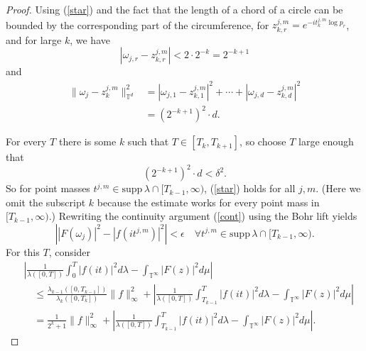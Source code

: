 \documentclass[]{elsarticle}
\newcommand{\T}{\mathbb{T}}
\numberwithin{equation}{section}
\begin{document}
\begin{proof}
          Using (\ref{star}) and the fact that the length of a chord of a circle can be bounded by the corresponding part of the circumference, for $z_{k,r}^{j,m} = e^{-it_{k}^{j,m}\log p_r}$, and for large $k$, we have
          \begin{equation}
            |\omega_{j,r}-z_{k,r}^{j,m}|< 2\cdot 2^{-k} = 2^{-k+1}
          \end{equation}
          and
          \begin{align*}
            \|\omega_j-z_k^{j,m}\|_{\T^d}^2 
            &= |\omega_{j,1}-z_{k,1}^{j,m}|^2 +\cdots + |\omega_{j,d}-z_{k,d}^{j,m}|^2\\
            &= (2^{-k+1})^2\cdot d.
          \end{align*}

          For every $T$ there is some $k$ such that $T\in [T_k, T_{k+1}]$, so choose $T$ large enough that 
            $$(2^{-k+1})^2\cdot d < \delta^2.$$
          So for point masses $t^{j,m}\in \text{supp}\, \lambda \cap [T_{k-1},\infty)$, (\ref{star}) holds for all $j,m$. (Here we omit the subscript $k$ because the estimate works for every point mass in $[T_{k-1},\infty)$.) Rewriting the continuity argument (\ref{cont}) using the Bohr lift yields
          \begin{equation} \label{tosubEpsilon}
            \left||F(\omega_j)|^2-|f(it^{j,m})|^2\right|<\epsilon \quad \forall t^{j,m}\in \text{supp}\, \lambda \cap [T_{k-1},\infty).
          \end{equation}
          For this $T$, consider 
          \begin{align*}
            &\left|\frac{1}{\lambda([0,T])} \int_{0}^{T} |f(it)|^2 d\lambda - \int_{\T^{\infty}}|F(z)|^2d\mu \right| \\
              &\quad \leq \frac{\lambda_{k-1}\left(\left[0,T_{k-1}\right]\right)}{\lambda_k([0,T_k])} \|f\|^2_\infty 
                + \left|\frac{1}{\lambda([0,T])} \int_{T_{k-1}}^{T} |f(it)|^2 d\lambda - \int_{\T^{\infty}}|F(z)|^2d\mu \right|\\
              &\quad = \frac{1}{2^k+1} \|f\|^2_\infty 
                + \left|\frac{1}{\lambda([0,T])} \int_{T_{k-1}}^{T} |f(it)|^2 d\lambda - \int_{\T^{\infty}}|F(z)|^2d\mu \right|.
          \end{align*}

\end{proof}
\end{document}
